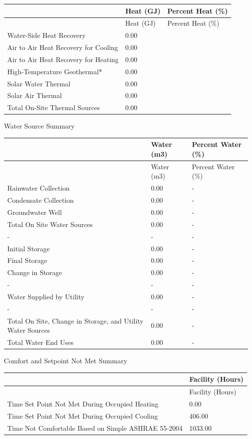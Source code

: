 \begin{longtable}[c]{@{}lll@{}}
\toprule
~ & Heat (GJ) & Percent Heat (\%) \tabularnewline
\midrule
\endfirsthead

\toprule
~ & Heat (GJ) & Percent Heat (\%) \tabularnewline
\midrule
\endhead

Water-Side Heat Recovery & 0.00 & ~ \tabularnewline
Air to Air Heat Recovery for Cooling & 0.00 & ~ \tabularnewline
Air to Air Heat Recovery for Heating & 0.00 & ~ \tabularnewline
High-Temperature Geothermal* & 0.00 & ~ \tabularnewline
Solar Water Thermal & 0.00 & ~ \tabularnewline
Solar Air Thermal & 0.00 & ~ \tabularnewline
Total On-Site Thermal Sources & 0.00 & ~ \tabularnewline
\bottomrule
\end{longtable}

Water Source Summary

\begin{longtable}[c]{>{\raggedright}p{3.0in}>{\raggedright}p{1.5in}>{\raggedright}p{1.5in}}
\toprule
~ & Water (m3) & Percent Water (\%) \tabularnewline
\midrule
\endfirsthead

\toprule
~ & Water (m3) & Percent Water (\%) \tabularnewline
\midrule
\endhead

Rainwater Collection & 0.00 & - \tabularnewline
Condensate Collection & 0.00 & - \tabularnewline
Groundwater Well & 0.00 & - \tabularnewline
Total On Site Water Sources & 0.00 & - \tabularnewline
- & - & - \tabularnewline
Initial Storage & 0.00 & - \tabularnewline
Final Storage & 0.00 & - \tabularnewline
Change in Storage & 0.00 & - \tabularnewline
- & - & - \tabularnewline
Water Supplied by Utility & 0.00 & - \tabularnewline
- & - & - \tabularnewline
Total On Site, Change in Storage, and Utility Water Sources & 0.00 & - \tabularnewline
Total Water End Uses & 0.00 & - \tabularnewline
\bottomrule
\end{longtable}

Comfort and Setpoint Not Met Summary

\begin{longtable}[c]{>{\raggedright}p{4.5in}>{\raggedright}p{1.5in}}
\toprule
~ & Facility (Hours) \tabularnewline
\midrule
\endfirsthead

\toprule
~ & Facility (Hours) \tabularnewline
\midrule
\endhead

Time Set Point Not Met During Occupied Heating & 0.00 \tabularnewline
Time Set Point Not Met During Occupied Cooling & 406.00 \tabularnewline
Time Not Comfortable Based on Simple ASHRAE 55-2004 & 1033.00 \tabularnewline
\bottomrule
\end{longtable}

